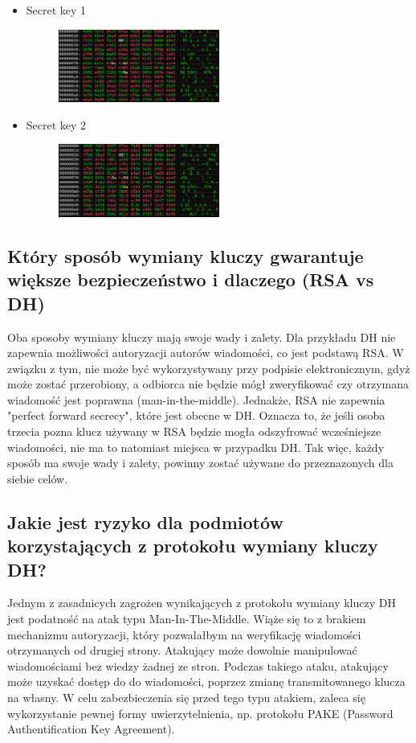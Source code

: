 \documentclass{article}
\begin{document}
\begin{itemize}
  \item Secret key 1
        \begin{figure}[H]
          \centering
          \includegraphics[width=0.5\textwidth]{secret_key1.png}
        \end{figure}
  \item Secret key 2
        \begin{figure}[H]
          \centering
          \includegraphics[width=0.5\textwidth]{secret_key2.png}
        \end{figure}
\end{itemize}

\subsection{Który sposób wymiany kluczy gwarantuje większe bezpieczeństwo i dlaczego (RSA vs DH)}
Oba sposoby wymiany kluczy mają swoje wady i zalety. Dla przykładu DH nie zapewnia możliwości autoryzacji autorów wiadomości,
co jest podstawą RSA. W związku z tym, nie może być wykorzystywany przy podpisie elektronicznym, gdyż może zostać przerobiony, a odbiorca nie będzie mógł zweryfikować
czy otrzymana wiadomość jest poprawna (man-in-the-middle). Jednakże, RSA nie zapewnia "perfect forward secrecy", które jest obecne w DH.
Oznacza to, że jeśli osoba trzecia pozna klucz używany w RSA będzie mogła odszyfrować wcześniejsze wiadomości, nie ma to natomiast miejsca w przypadku DH.
Tak więc, każdy sposób ma swoje wady i zalety, powinny zostać używane do przeznazonych dla siebie celów.

\subsection{Jakie jest ryzyko dla podmiotów korzystających z protokołu wymiany kluczy DH?}
Jednym z zasadnicych zagrożen wynikających z protokołu wymiany kluczy DH jest podatność na atak typu Man-In-The-Middle. Wiąże się to z brakiem
mechanizmu autoryzacji, który pozwalałbym na weryfikację wiadomości otrzymanych od drugiej strony. Atakujący może dowolnie manipulować wiadomościami bez wiedzy żadnej ze stron.
Podczas takiego ataku, atakujący może uzyskać dostęp do do wiadomości, poprzez zmianę transmitowanego klucza na własny. W celu zabezbieczenia się przed tego typu atakiem,
zaleca się wykorzystanie pewnej formy uwierzytelnienia, np. protokołu PAKE (Password Authentification Key Agreement).
\end{document}
